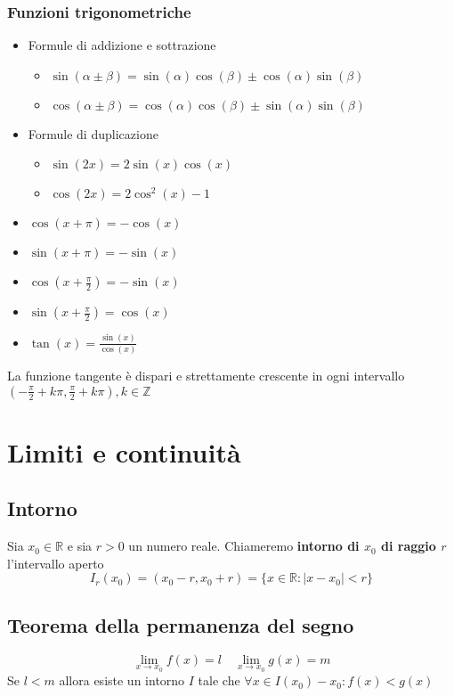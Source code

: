 \documentclass[12pt, a4paper]{report}
\begin{document}
    \subsection{Funzioni trigonometriche}
    \begin{itemize}
        \item Formule di addizione e sottrazione \begin{itemize}
            \item $\sin(\alpha \pm \beta)=\sin(\alpha)\cos(\beta)\pm \cos(\alpha)\sin(\beta)$
            \item $\cos(\alpha \pm \beta)=\cos(\alpha)\cos(\beta)\pm \sin(\alpha)\sin(\beta)$
        \end{itemize}
        \item Formule di duplicazione \begin{itemize}
            \item $\sin(2x)=2\sin(x)\cos(x)$
            \item $\cos(2x)=2\cos^{2}(x)-1$
        \end{itemize}
        \item $\cos(x+\pi)=-\cos(x)$
        \item $\sin(x+\pi)=-\sin(x)$
        \item $\cos(x+\frac{\pi}{2})=-\sin(x)$
        \item $\sin(x+\frac{\pi}{2})=\cos(x)$
        \item $\tan(x)=\frac{\sin(x)}{\cos(x)}$
    \end{itemize}
    La funzione tangente è dispari e strettamente crescente in ogni intervallo $(-\frac{\pi}{2}+k\pi,\frac{\pi}{2}+k\pi),k\in \mathbb{Z}$
    \chapter{Limiti e continuità}
    \section{Intorno}
    Sia $x_{0}\in \mathbb{R}$ e sia $r>0$ un numero reale. Chiameremo \textbf{intorno di $x_{0}$ di raggio $r$} l'intervallo aperto
    \begin{equation*}
        I_{r}(x_{0})=(x_{0}-r,x_{0}+r)=\{x\in\mathbb{R}:|x-x_{0}|<r\}
    \end{equation*}
    \section{Teorema della permanenza del segno}
    \begin{equation*}
        \lim_{x\to x_{0}}f(x)=l \quad \lim_{x\to x_{0}}g(x)=m 
    \end{equation*}
    Se $l<m$ allora esiste un intorno $I$ tale che $\forall x \in I(x_{0})-x_{0}: f(x)<g(x)$
\end{document}
